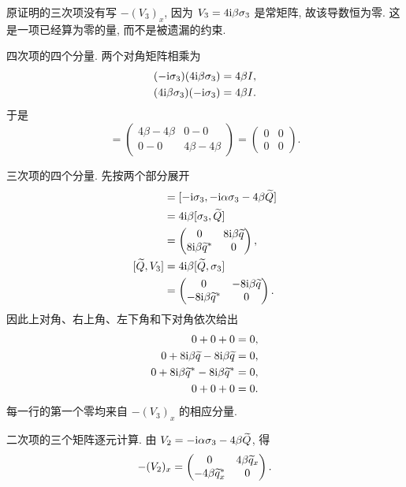 原证明的三次项没有写 $-(V_3)_x$, 因为 $V_3=4\mathrm{i}\beta\sigma_3$ 是常矩阵, 故该导数恒为零. 这是一项已经算为零的量, 而不是被遗漏的约束.
\par\smallskip\noindent 四次项的四个分量.\quad
两个对角矩阵相乘为
\begin{align*}
(-\mathrm{i}\sigma_3)(4\mathrm{i}\beta\sigma_3)
&=4\beta I,\\
(4\mathrm{i}\beta\sigma_3)(-\mathrm{i}\sigma_3)
&=4\beta I.
\end{align*}
于是
\begin{equation*}
[-\ii\sg,V_3]
=\begin{pmatrix}4\beta-4\beta&0-0\\0-0&4\beta-4\beta\end{pmatrix}
=\begin{pmatrix}0&0\\0&0\end{pmatrix}.
\end{equation*}
\par\smallskip\noindent 三次项的四个分量.\quad
先按两个部分展开
\begin{align*}
[-\ii\sg,V_2]
&=[-\ii\sg,-\ii\alpha\sg-4\beta\widetilde Q]\\
&=4\ii\beta[\sg,\widetilde Q]\\
&=\begin{pmatrix}
0&8\ii\beta\widetilde q\\
8\ii\beta\conj{\widetilde q}&0
\end{pmatrix},\\
[\widetilde Q,V_3]
&=4\ii\beta[\widetilde Q,\sg]\\
&=\begin{pmatrix}
0&-8\ii\beta\widetilde q\\
-8\ii\beta\conj{\widetilde q}&0
\end{pmatrix}.
\end{align*}
因此上对角、右上角、左下角和下对角依次给出
\begin{align*}
0+0+0&=0,\\
0+8\mathrm{i}\beta\widetilde q-8\mathrm{i}\beta\widetilde q&=0,\\
0+8\mathrm{i}\beta{\widetilde q}^{*}
-8\mathrm{i}\beta{\widetilde q}^{*}&=0,\\
0+0+0&=0.
\end{align*}
每一行的第一个零均来自 $-(V_3)_x$ 的相应分量.
\par\smallskip\noindent 二次项的三个矩阵逐元计算.\quad
由 $V_2=-\mathrm{i}\alpha\sigma_3-4\beta\widetilde Q$, 得
\begin{equation*}
-(V_2)_x=
\begin{pmatrix}
0&4\beta\widetilde q_x\\
-4\beta{\widetilde q_x}^{*}&0
\end{pmatrix}.
\end{equation*}
